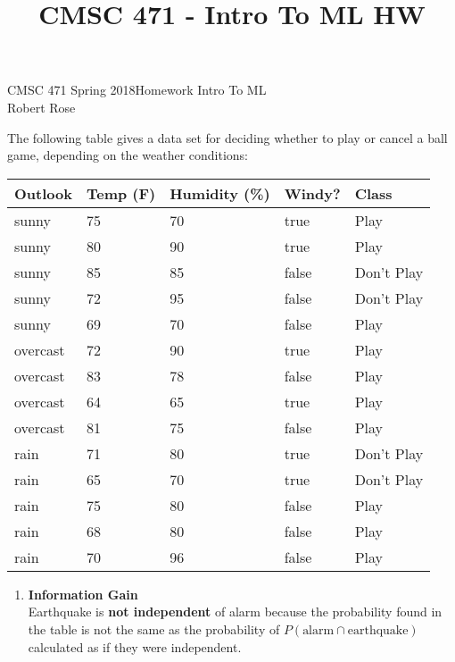\documentclass[12pt]{article}
\title{CMSC 471 - Intro To ML HW}
\begin{document}
CMSC 471 Spring 2018\hfill Homework Intro To ML\\
Robert Rose

\hrulefill

The following table gives a data set for deciding whether to play or cancel a ball game, depending on the weather conditions:\\

\begin{center}
\begin{tabular}{l|l|l|l|l}
      \textbf{Outlook} & \textbf{Temp (F)} & \textbf{Humidity (\%)} & \textbf{Windy?} & \textbf{Class}\\
      \hline
      sunny & 75 & 70 & true & Play\\
      sunny & 80 & 90 & true & Play\\
      sunny & 85 & 85 & false & Don't Play\\
      sunny & 72 & 95 & false & Don't Play\\
      sunny & 69 & 70 & false & Play\\
      overcast & 72 & 90 & true & Play\\
      overcast & 83 & 78 & false & Play\\
      overcast & 64 & 65 & true & Play\\
      overcast & 81 & 75 & false & Play\\
      rain & 71 & 80 & true & Don't Play\\
      rain & 65 & 70 & true & Don't Play\\
      rain & 75 & 80 & false & Play\\
      rain & 68 & 80 & false & Play\\
      rain & 70 & 96 & false & Play
\end{tabular}
\end{center}

\vspace{-2em}

\begin{enumerate}
\item \textbf{Information Gain} \\


Earthquake is \textbf{not independent} of alarm because the probability found in the table is not the same as the probability of $P(\text{alarm} \cap \text{earthquake})$ calculated as if they were independent.

\newpage

\end{enumerate}
\end{document}
